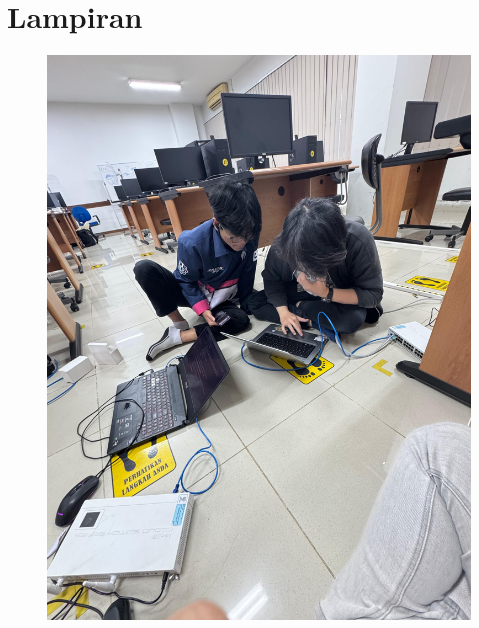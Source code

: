 \section{Lampiran}
\begin{figure}[H]
    \centering
    \includegraphics[width=0.65\linewidth]{image/dokum.jpg}
    \label{fig:inirujukan}
\end{figure}
